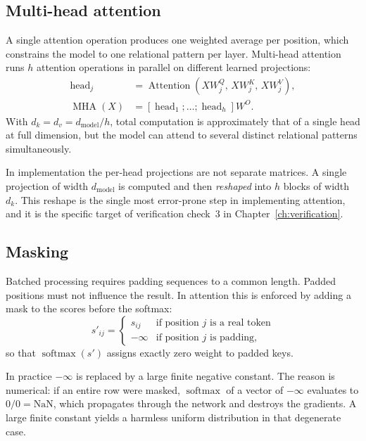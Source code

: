\subsection{Multi-head attention}

A single attention operation produces one weighted average per position, which constrains the model
to one relational pattern per layer. Multi-head attention runs $h$ attention operations in
parallel on different learned projections:
\begin{align}
\operatorname{head}_j &= \operatorname{Attention}\!\left(XW_j^{Q},\, XW_j^{K},\, XW_j^{V}\right), \\
\operatorname{MHA}(X) &= \left[\operatorname{head}_1 ; \dots ; \operatorname{head}_h\right] W^{O} .
\label{eq:mha}
\end{align}
With $d_k = d_v = d_{\text{model}}/h$, total computation is approximately that of a single head at
full dimension, but the model can attend to several distinct relational patterns simultaneously.

In implementation the per-head projections are not separate matrices. A single projection of width
$d_{\text{model}}$ is computed and then \emph{reshaped} into $h$ blocks of width $d_k$. This
reshape is the single most error-prone step in implementing attention, and it is the specific
target of verification check~3 in Chapter~\ref{ch:verification}.

\subsection{Masking}
\label{sec:masking}

Batched processing requires padding sequences to a common length. Padded positions must not
influence the result. In attention this is enforced by adding a mask to the scores before the
softmax:
\begin{equation}
s'_{ij} = \begin{cases}
s_{ij} & \text{if position } j \text{ is a real token} \\
-\infty & \text{if position } j \text{ is padding,}
\end{cases}
\end{equation}
so that $\operatorname{softmax}(s')$ assigns exactly zero weight to padded keys.

In practice $-\infty$ is replaced by a large finite negative constant. The reason is numerical: if
an entire row were masked, $\operatorname{softmax}$ of a vector of $-\infty$ evaluates to
$0/0 = \text{NaN}$, which propagates through the network and destroys the gradients. A large
finite constant yields a harmless uniform distribution in that degenerate case.

